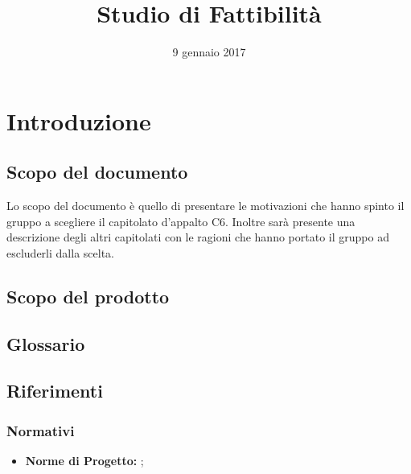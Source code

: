


\author{\AZ}
\supervisor{\LS}
\dest{\TV, \RC}
\title{Studio di Fattibilità}
\date{9 gennaio 2017}


\maketitle

\tableofcontents
\newpage

\section{Introduzione}
	\subsection{Scopo del documento}
	Lo scopo del documento è quello di presentare le motivazioni che hanno spinto il gruppo \hx{} a scegliere il capitolato d'appalto C6. 
	Inoltre sarà presente una descrizione degli altri capitolati con le ragioni che hanno portato il gruppo ad escluderli dalla scelta.
	
	\subsection{Scopo del prodotto}
	\scopo{}
	
	\subsection{Glossario}
	\presgloss{}
	
	\subsection{Riferimenti}
		\subsubsection{Normativi}
		\begin{itemize}
			\item \textbf{Norme di Progetto: } \emph{\NdP};
		\end{itemize}
